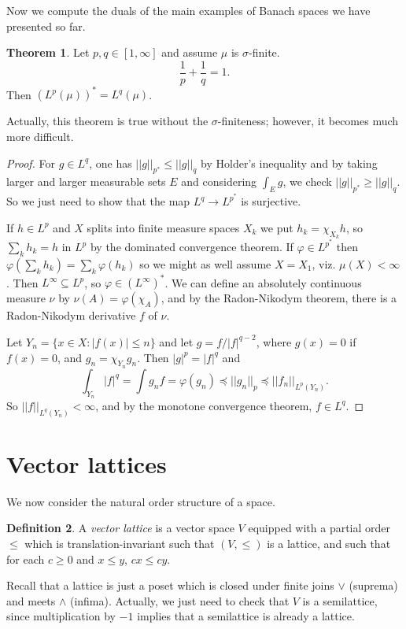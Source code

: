 \documentclass[12pt]{report}
\newcommand{\dfn}[1]{\emph{#1}\index{#1}}
\theoremstyle{definition}
\newtheorem{theorem}{Theorem}[chapter]
\newtheorem{definition}[theorem]{Definition}
\begin{document}
    Now we compute the duals of the main examples of Banach spaces we have presented so far.
\begin{theorem}
    Let $p, q \in [1, \infty]$ and assume $\mu$ is $\sigma$-finite.
    $$\frac{1}{p} + \frac{1}{q} = 1.$$
    Then $(L^p(\mu))^* = L^q(\mu)$.
\end{theorem}
    Actually, this theorem is true without the $\sigma$-finiteness; however, it becomes much more difficult.
\begin{proof}
    For $g \in L^q$, one has $||g||_{p^*} \leq ||g||_q$ by Holder's inequality and by taking larger and larger measurable sets $E$ and considering $\int_E g$, we check $||g||_{p^*} \geq ||g||_q$. So we just need to show that the map $L^q \to L^{p^*}$ is surjective.

    If $h \in L^p$ and $X$ splits into finite measure spaces $X_k$ we put $h_k = \chi_{X_k}h$, so $\sum_k h_k = h$ in $L^p$ by the dominated convergence theorem. If $\varphi \in L^{p^*}$ then $\varphi(\sum_k h_k) = \sum_k \varphi(h_k)$ so we might as well assume $X = X_1$, viz. $\mu(X) < \infty$. Then $L^\infty \subseteq L^p$, so $\varphi \in (L^\infty)^*$. We can define an absolutely continuous measure $\nu$ by $\nu(A) = \varphi(\chi_A)$, and by the Radon-Nikodym theorem, there is a Radon-Nikodym derivative $f$ of $\nu$.

    Let $Y_n = \{x \in X: |f(x)| \leq n\}$ and let $g = f/|f|^{q-2}$, where $g(x) = 0$ if $f(x) = 0$, and $g_n = \chi_{Y_n}g_n$. Then $|g|^p = |f|^q$ and
    $$\int_{Y_n} |f|^q = \int g_nf = \varphi(g_n) \preceq ||g_n||_p \preceq ||f_n||_{L^p(Y_n)}.$$
    So $||f||_{L^q(Y_n)} < \infty$, and by the monotone convergence theorem, $f \in L^q$.
\end{proof}

\section{Vector lattices}
    We now consider the natural order structure of a space.
\begin{definition}
    A \dfn{vector lattice} is a vector space $V$ equipped with a partial order $\leq$ which is translation-invariant such that $(V, \leq)$ is a lattice, and such that for each $c \geq 0$ and $x \leq y$, $cx \leq cy$.
\end{definition}
    Recall that a lattice is just a poset which is closed under finite joins $\vee$ (suprema) and meets $\wedge$ (infima). Actually, we just need to check that $V$ is a semilattice, since multiplication by $-1$ implies that a semilattice is already a lattice.
\end{document}
